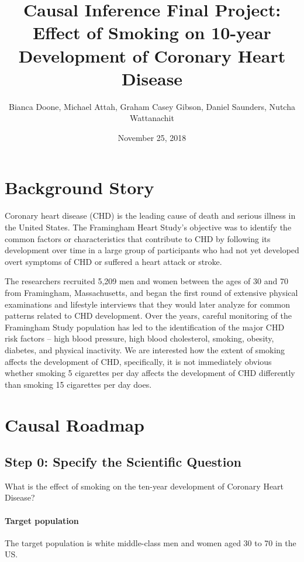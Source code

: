 \documentclass[]{article}
\title{Causal Inference Final Project: Effect of Smoking on 10-year Development
of Coronary Heart Disease}
\author{Bianca Doone, Michael Attah, Graham Casey Gibson, Daniel Saunders,
Nutcha Wattanachit}
\date{November 25, 2018}
\let\oldparagraph\paragraph
\renewcommand{\paragraph}[1]{\oldparagraph{#1}\mbox{}}
\begin{document}
\maketitle

\section{Background Story}\label{background-story}

Coronary heart disease (CHD) is the leading cause of death and serious
illness in the United States. The Framingham Heart Study's objective was
to identify the common factors or characteristics that contribute to CHD
by following its development over time in a large group of participants
who had not yet developed overt symptoms of CHD or suffered a heart
attack or stroke.

The researchers recruited 5,209 men and women between the ages of 30 and
70 from Framingham, Massachusetts, and began the first round of
extensive physical examinations and lifestyle interviews that they would
later analyze for common patterns related to CHD development. Over the
years, careful monitoring of the Framingham Study population has led to
the identification of the major CHD risk factors -- high blood pressure,
high blood cholesterol, smoking, obesity, diabetes, and physical
inactivity. We are interested how the extent of smoking affects the
development of CHD, specifically, it is not immediately obvious whether
smoking 5 cigarettes per day affects the development of CHD differently
than smoking 15 cigarettes per day does.

\section{Causal Roadmap}\label{causal-roadmap}

\subsection{Step 0: Specify the Scientific
Question}\label{step-0-specify-the-scientific-question}

What is the effect of smoking on the ten-year development of Coronary
Heart Disease?

\paragraph{Target population}\label{target-population}

The target population is white middle-class men and women aged 30 to 70
in the US.
\end{document}
